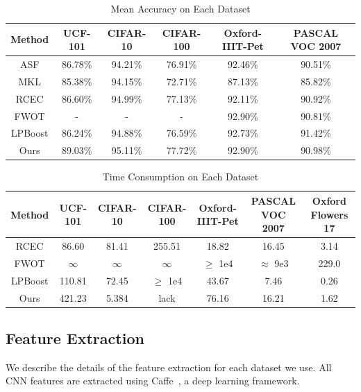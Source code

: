 \documentclass[letterpaper]{article}
\begin{document}
\begin{table}[t]\small
\centering
\begin{tabular}{c|c|c|c|c|c}
\hline
Method              & UCF-101  & CIFAR-10 & CIFAR-100 & Oxford-IIIT-Pet & PASCAL VOC 2007      \\\hline
ASF                 & 86.78\%  & 94.21\%  & 76.91\%   & 92.46\%         &   90.51\%            \\
MKL                 & 85.38\%  & 94.15\%  & 72.71\%   & 87.13\%         &   85.82\%            \\
RCEC                & 86.60\%  & 94.99\%  & 77.13\%   & 92.11\%         &   90.92\%            \\ 
FWOT                & -        & -        & -         & 92.90\%         &   90.81\%            \\    %
LPBoost             & 86.24\%  & 94.88\%  & 76.59\%   & 92.73\%         &   91.42\%            \\\hline
Ours                & 89.03\%  & 95.11\%  & 77.72\%   & 92.90\%         &   90.98\%            \\ 
\hline
\end{tabular}
\caption{Mean Accuracy on Each Dataset}
\label{table:total_acc}
\end{table}


\begin{table}[t]\small
\centering
\begin{tabular}{c|c|c|c|c|c|c}
\hline
Method              & UCF-101    & CIFAR-10  & CIFAR-100  & Oxford-IIIT-Pet & PASCAL VOC 2007 & Oxford Flowers 17 \\\hline
RCEC                & 86.60      & 81.41     &  255.51    & 18.82           &   16.45         & 3.14   \\ 
FWOT                & $\infty$   & $\infty$  & $\infty$   & $\geq$ 1e4      &   $\approx$ 9e3 & 229.0  \\
LPBoost             & 110.81     & 72.45     & $\geq$ 1e4 & 43.67           &   7.46          & 0.26   \\\hline
Ours                & 421.23     & 5.384     &   lack     & 76.16           &   16.21         & 1.62   \\ 
\hline
\end{tabular}
\caption{Time Consumption on Each Dataset}
\label{table:total_time}
\end{table}




\subsection{Feature Extraction}
We describe the details of the feature extraction for each dataset we use. 
All CNN features are extracted using Caffe~\cite{jia2014caffe}, a deep learning framework.
\end{document}
